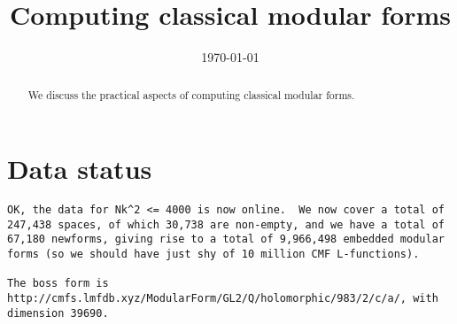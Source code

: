 \documentclass[11pt]{amsart}
\numberwithin{equation}{subsection}
\theoremstyle{definition}
\begin{document}
\title{Computing classical modular forms}
\author{}
\address{}
\email{}
\urladdr{}

\author{}
\address{}
\email{}
\urladdr{}


\date{\today}


\begin{abstract}
We discuss the practical aspects of computing classical modular forms.
\end{abstract}

\maketitle
\tableofcontents

\section{Data status}

\begin{verbatim}
OK, the data for Nk^2 <= 4000 is now online.  We now cover a total of 
247,438 spaces, of which 30,738 are non-empty, and we have a total of 
67,180 newforms, giving rise to a total of 9,966,498 embedded modular 
forms (so we should have just shy of 10 million CMF L-functions).

The boss form is 
http://cmfs.lmfdb.xyz/ModularForm/GL2/Q/holomorphic/983/2/c/a/, with 
dimension 39690.
\end{verbatim}
\end{document}

